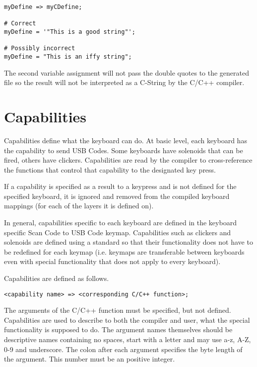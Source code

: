 \documentclass{kiibohd-template}
\begin{document}
\begin{lstlisting}
myDefine => myCDefine;

# Correct
myDefine = '"This is a good string"';

# Possibly incorrect
myDefine = "This is an iffy string";
\end{lstlisting}

The second variable assignment will not pass the double quotes to the generated file so the result will not be interpreted as a C-String by the C/C++ compiler.


\chapter{Capabilities}
\label{chpt:Capabilities}

Capabilities define what the keyboard can do.
At basic level, each keyboard has the capability to send USB Codes.
Some keyboards have solenoids that can be fired, others have clickers.
Capabilities are read by the compiler to cross-reference the functions that control that capability to the designated key press.

If a capability is specified as a result to a keypress and is not defined for the specified keyboard, it is ignored and removed from the compiled keyboard mappings (for each of the layers it is defined on).

In general, capabilities specific to each keyboard are defined in the keyboard specific Scan Code to USB Code keymap.
Capabilities such as clickers and solenoids are defined using a standard so that their functionality does not have to be redefined for each keymap (i.e. keymaps are transferable between keyboards even with special functionality that does not apply to every keyboard).

Capabilities are defined as follows.

\begin{lstlisting}
<capability name> => <corresponding C/C++ function>;
\end{lstlisting}

The arguments of the C/C++ function must be specified, but not defined.
Capabilities are used to describe to both the compiler and user, what the special functionality is supposed to do.
The argument names themselves should be descriptive names containing no spaces, start with a letter and may use a-z, A-Z, 0-9 and underscore.
The colon after each argument specifies the byte length of the argument.
This number must be an positive integer.
\end{document}
